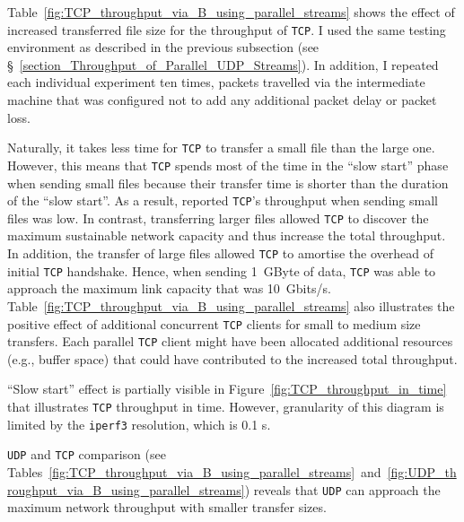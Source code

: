 \documentclass[12pt,a4paper]{report}
\begin{document}
Table~\ref{fig:TCP_throughput_via_B_using_parallel_streams} shows the effect of increased transferred file size for the throughput of \texttt{TCP}.
I used  the same testing environment as described in the previous subsection (see \S~\ref{section_Throughput_of_Parallel_UDP_Streams}).
In addition, I repeated each individual experiment ten times, packets travelled via the intermediate machine that was configured not to add any additional packet delay or packet loss.

Naturally, it takes less time for \texttt{TCP} to transfer a small file than the large one.
However, this means that \texttt{TCP} spends most of the time in the \enquote{slow start} phase when sending small files because their transfer time is shorter than the duration of the \enquote{slow start}.
As a result, reported \texttt{TCP}'s throughput when sending small files was low.
In contrast, transferring larger files allowed \texttt{TCP} to discover the maximum sustainable network capacity and thus increase the total throughput.
In addition, the transfer of large files allowed \texttt{TCP} to amortise the overhead of initial \texttt{TCP} handshake.
Hence, when sending 1~GByte of data, \texttt{TCP} was able to approach the maximum link capacity that was 10~Gbits/s.
Table~\ref{fig:TCP_throughput_via_B_using_parallel_streams} also illustrates the positive effect of additional concurrent \texttt{TCP} clients for small to medium size transfers.
Each parallel \texttt{TCP} client might have been allocated additional resources (e.g., buffer space) that could have contributed to the increased total throughput.


\enquote{Slow start} effect is partially visible in Figure~\ref{fig:TCP_throughput_in_time} that illustrates \texttt{TCP} throughput in time.
However, granularity of this diagram is limited by the \texttt{iperf3} resolution, which is 0.1 s.

\texttt{UDP} and \texttt{TCP} comparison (see Tables~\ref{fig:TCP_throughput_via_B_using_parallel_streams}~and~\ref{fig:UDP_throughput_via_B_using_parallel_streams}) reveals that \texttt{UDP} can approach the maximum network throughput with smaller transfer sizes.
\end{document}

